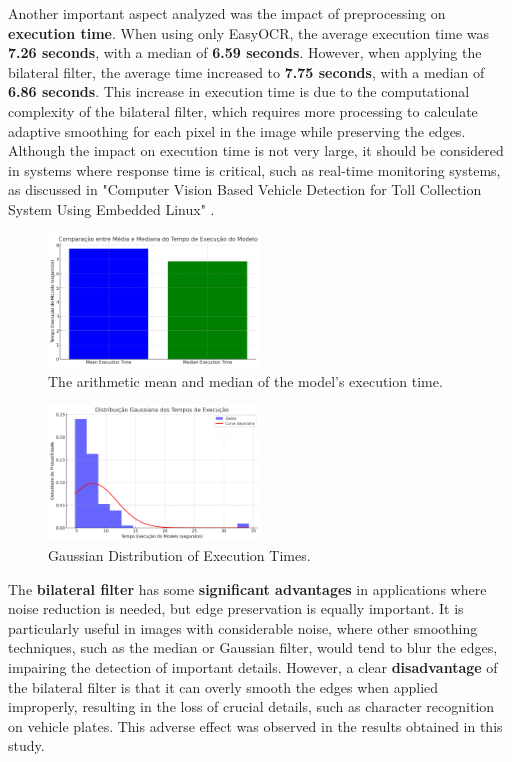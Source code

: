 \documentclass[conference]{IEEEtran}
\begin{document}
	Another important aspect analyzed was the impact of preprocessing on \textbf{execution time}. When using only EasyOCR, the average execution time was \textbf{7.26 seconds}, with a median of \textbf{6.59 seconds}. However, when applying the bilateral filter, the average time increased to \textbf{7.75 seconds}, with a median of \textbf{6.86 seconds}. This increase in execution time is due to the computational complexity of the bilateral filter, which requires more processing to calculate adaptive smoothing for each pixel in the image while preserving the edges. Although the impact on execution time is not very large, it should be considered in systems where response time is critical, such as real-time monitoring systems, as discussed in "Computer Vision Based Vehicle Detection for Toll Collection System Using Embedded Linux" \cite{b16}.
	
	\begin{figure}[htbp]
		\centerline{\includegraphics[width=0.5\textwidth]{img14.png}}
		\caption{The arithmetic mean and median of the model's execution time.}
		\label{img14}
	\end{figure}
	
	\begin{figure}[htbp]
		\centerline{\includegraphics[width=0.5\textwidth]{img15.png}}
		\caption{Gaussian Distribution of Execution Times.}
		\label{img15}
	\end{figure}
	
	
	The \textbf{bilateral filter} has some \textbf{significant advantages} in applications where noise reduction is needed, but edge preservation is equally important. It is particularly useful in images with considerable noise, where other smoothing techniques, such as the median or Gaussian filter, would tend to blur the edges, impairing the detection of important details. However, a clear \textbf{disadvantage} of the bilateral filter is that it can overly smooth the edges when applied improperly, resulting in the loss of crucial details, such as character recognition on vehicle plates. This adverse effect was observed in the results obtained in this study.
	
\end{document}
